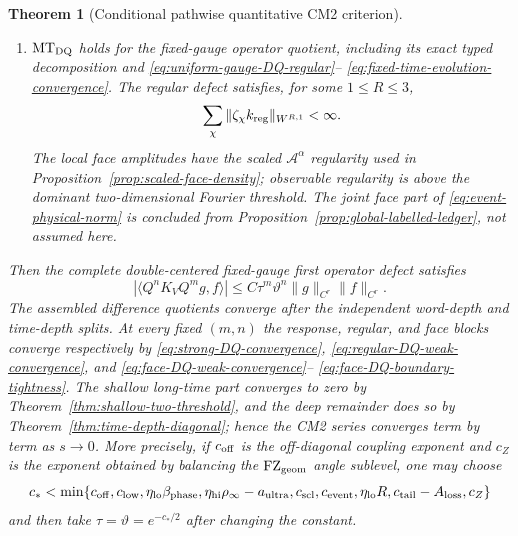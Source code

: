 \documentclass[11pt]{article}
\newtheorem{theorem}{Theorem}[section]
\begin{document}
\begin{theorem}[Conditional pathwise quantitative CM2 criterion]
\begin{enumerate}[label=\textup{(H\arabic*)}]
      weighted component complexity, angle sublevel, and good-angle exponent
      $A_{\rm ang}$, together with $\mathrm{SF}_{\rm split}$ and
      $\mathrm{CP}_{\rm env}$ on the same spacetime cells;
      Proposition~\ref{prop:envelope-dynamical-tube}
      then supplies \eqref{eq:FZ-dynamical-tube}; the shallow finite-$s$
      source satisfies $\mathrm{SHCOL}_{\rm env}$ and the strict nonempty
      window \eqref{eq:shallow-time-window}; the terminal tail satisfies
      $\mathrm{TAIL}_{\rm env}^{+}$ and
      $\mathrm{NREC}_{\rm deep}(q_{\rm deep})$ with
      $q_{\rm deep}>\max\{\alpha_+,\alpha_-\}$;
\item $\mathrm{MT}_{\rm DQ}$ holds for the fixed-gauge operator quotient,
      including its exact typed decomposition and
      \eqref{eq:uniform-gauge-DQ-regular}--
      \eqref{eq:fixed-time-evolution-convergence}.  The regular defect
      satisfies, for some
      $1\le R\le3$,
      \[
       \sum_\chi\|\zeta_\chi k_{\rm reg}\|_{W^{R,1}}<\infty.
      \]
      The local face amplitudes have the scaled
      $\mathcal A^\alpha$ regularity used in
      Proposition~\ref{prop:scaled-face-density}; observable regularity is
      above the dominant two-dimensional Fourier threshold.  The joint face
      part of \eqref{eq:event-physical-norm} is concluded from
      Proposition~\ref{prop:global-labelled-ledger}, not assumed here.
\end{enumerate}
Then the complete double-centered fixed-gauge first operator defect satisfies
\[
 |\langle Q^nK_VQ^mg,f\rangle|
 \le C\tau^m\vartheta^n\|g\|_{C^r}\|f\|_{C^r}.
\]
The assembled difference quotients converge after the independent word-depth
and time-depth splits.  At every fixed $(m,n)$ the response, regular, and face
blocks converge respectively by
\eqref{eq:strong-DQ-convergence},
\eqref{eq:regular-DQ-weak-convergence}, and
\eqref{eq:face-DQ-weak-convergence}--
\eqref{eq:face-DQ-boundary-tightness}.  The shallow long-time part converges to zero by
Theorem~\ref{thm:shallow-two-threshold}, and the deep remainder does so by
Theorem~\ref{thm:time-depth-diagonal}; hence the CM2 series converges term by
term as $s\to0$.  More
precisely, if $c_{\rm off}$ is the off-diagonal coupling exponent and $c_Z$
is the exponent obtained by balancing the $\mathrm{FZ}_{\rm geom}$ angle sublevel, one
may choose
\begin{equation}
\label{eq:final-CM2-exponent}
 c_*<\min\{c_{\rm off},c_{\rm low},
 \eta_{\rm lo}\beta_{\rm phase},
 \eta_{\rm hi}\rho_\infty-a_{\rm ultra},c_{\rm scl},
 c_{\rm event},\eta_{\rm lo}R,
 c_{\rm tail}-A_{\rm loss},c_Z\}
\end{equation}
and then take $\tau=\vartheta=e^{-c_*/2}$ after changing the constant.
\end{theorem}
\end{document}
